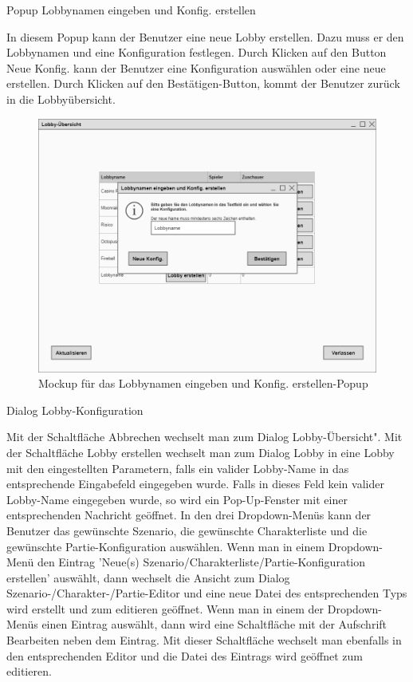 Popup \glqq{}Lobbynamen eingeben und Konfig. erstellen\grqq{}

In diesem Popup kann der Benutzer eine neue Lobby erstellen. Dazu muss er den Lobbynamen und eine Konfiguration festlegen. Durch Klicken auf den Button Neue Konfig. kann der Benutzer eine Konfiguration auswählen oder eine neue erstellen. Durch Klicken auf den Bestätigen-Button, kommt der Benutzer zurück in die Lobbyübersicht.

\begin{figure}
  \centering
  \includegraphics[width=\textwidth]{Meilenstein03/LobbynamenEingebenUndKonfigErstellen_Mockup.png}
  \caption{Mockup für das Lobbynamen eingeben und Konfig. erstellen-Popup}
\end{figure}

Dialog \glqq{}Lobby-Konfiguration\grqq{}

Mit der Schaltfläche \glqq{}Abbrechen\grqq{} wechselt man zum Dialog \glqq{}Lobby-Übersicht".
Mit der Schaltfläche \glqq{}Lobby erstellen\grqq{} wechselt man zum Dialog \glqq{}Lobby\grqq{} in eine Lobby mit den eingestellten Parametern, falls ein valider Lobby-Name in das entsprechende Eingabefeld eingegeben wurde.
Falls in dieses Feld kein valider Lobby-Name eingegeben wurde, so wird ein Pop-Up-Fenster mit einer entsprechenden Nachricht geöffnet.
In den drei Dropdown-Menüs kann der Benutzer das gewünschte Szenario, die gewünschte Charakterliste und die gewünschte Partie-Konfiguration auswählen. Wenn man in einem Dropdown-Menü den Eintrag 'Neue(s) Szenario/Charakterliste/Partie-Konfiguration erstellen' auswählt, dann wechselt die Ansicht zum Dialog \glqq{}Szenario-/Charakter-/Partie-Editor\grqq{} und eine neue Datei des entsprechenden Typs wird erstellt und zum editieren geöffnet.
Wenn man in einem der Dropdown-Menüs einen Eintrag auswählt, dann wird eine Schaltfläche mit der Aufschrift \glqq{}Bearbeiten\grqq{} neben dem Eintrag. Mit dieser Schaltfläche wechselt man ebenfalls in den entsprechenden Editor und die Datei des Eintrags wird geöffnet zum editieren.

